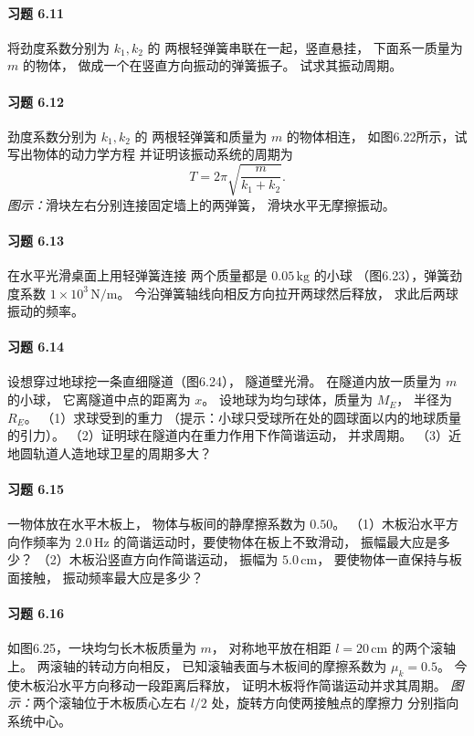 \paragraph{习题 6.11}
将劲度系数分别为 \(k_1,k_2\) 的
两根轻弹簧串联在一起，竖直悬挂，
下面系一质量为 \(m\) 的物体，
做成一个在竖直方向振动的弹簧振子。
试求其振动周期。

\paragraph{习题 6.12}
劲度系数分别为 \(k_1,k_2\) 的
两根轻弹簧和质量为 \(m\) 的物体相连，
如图6.22所示，试写出物体的动力学方程
并证明该振动系统的周期为
\[
 T=2\pi\sqrt{\frac m{k_1+k_2}}.
\]
\textit{图示：}滑块左右分别连接固定墙上的两弹簧，
滑块水平无摩擦振动。

\paragraph{习题 6.13}
在水平光滑桌面上用轻弹簧连接
两个质量都是 \(0.05\,\mathrm{kg}\) 的小球
（图6.23），弹簧劲度系数
\(1\times10^3\,\mathrm{N/m}\)。
今沿弹簧轴线向相反方向拉开两球然后释放，
求此后两球振动的频率。

\paragraph{习题 6.14}
设想穿过地球挖一条直细隧道（图6.24），
隧道壁光滑。
在隧道内放一质量为 \(m\) 的小球，
它离隧道中点的距离为 \(x\)。
设地球为均匀球体，质量为 \(M_E\)，
半径为 \(R_E\)。
（1）求球受到的重力
（提示：小球只受球所在处的圆球面以内的地球质量的引力）。
（2）证明球在隧道内在重力作用下作简谐运动，
并求周期。
（3）近地圆轨道人造地球卫星的周期多大？

\paragraph{习题 6.15}
一物体放在水平木板上，
物体与板间的静摩擦系数为 \(0.50\)。
（1）木板沿水平方向作频率为 \(2.0\,\mathrm{Hz}\)
的简谐运动时，要使物体在板上不致滑动，
振幅最大应是多少？
（2）木板沿竖直方向作简谐运动，
振幅为 \(5.0\,\mathrm{cm}\)，
要使物体一直保持与板面接触，
振动频率最大应是多少？

\paragraph{习题 6.16}
如图6.25，一块均匀长木板质量为 \(m\)，
对称地平放在相距 \(l=20\,\mathrm{cm}\)
的两个滚轴上。
两滚轴的转动方向相反，
已知滚轴表面与木板间的摩擦系数为
\(\mu_k=0.5\)。
今使木板沿水平方向移动一段距离后释放，
证明木板将作简谐运动并求其周期。
\textit{图示：}两个滚轴位于木板质心左右
\(l/2\) 处，旋转方向使两接触点的摩擦力
分别指向系统中心。

